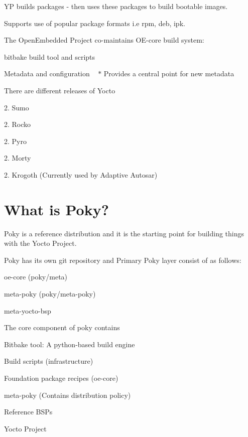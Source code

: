 \begin{DoxyItemize}
\item YP builds packages -\/ then uses these packages to build bootable images.
\item Supports use of popular package formats i.\+e rpm, deb, ipk.
\item The Open\+Embedded Project co-\/maintains O\+E-\/core build system\+:
\begin{DoxyItemize}
\item bitbake build tool and scripts
\item Metadata and configuration ~\newline
 $\ast$ Provides a central point for new metadata
\end{DoxyItemize}
\item There are different releases of Yocto
\begin{DoxyItemize}
\item 2. Sumo
\item 2. Rocko
\item 2. Pyro
\item 2. Morty
\item 2. Krogoth (Currently used by Adaptive Autosar) 
\end{DoxyItemize}
\end{DoxyItemize}

\section*{What is Poky?}


\begin{DoxyItemize}
\item Poky is a reference distribution and it is the starting point for building things with the Yocto Project.
\item Poky has its own git repository and Primary Poky layer consist of as follows\+:
\begin{DoxyItemize}
\item oe-\/core (poky/meta)
\item meta-\/poky (poky/meta-\/poky)
\item meta-\/yocto-\/bsp
\end{DoxyItemize}
\item The core component of poky contains
\begin{DoxyItemize}
\item Bitbake tool\+: A python-\/based build engine
\item Build scripts (infrastructure)
\item Foundation package recipes (oe-\/core)
\item meta-\/poky (Contains distribution policy)
\item Reference B\+S\+Ps
\item Yocto Project 
\end{DoxyItemize}
\end{DoxyItemize}

